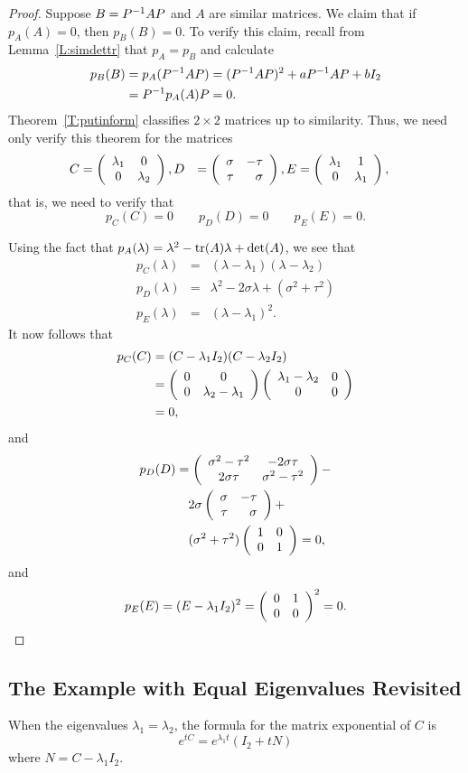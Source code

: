 \documentclass{ximera}
\begin{document}
\begin{proof}  Suppose $B=P^{-1} AP$ and $A$ are similar matrices.  We claim that
if $p_A(A)=0$, then $p_B(B)=0$.  To verify this claim, recall from
Lemma~\ref{L:simdettr} that $p_A=p_B$ and calculate
\begin{align*}
  p_B(B) &= p_A(P^{-1} AP) = (P^{-1} AP)^2 + aP^{-1} AP + bI_2 \\
  &= P^{-1} p_A(A)P= 0.
\end{align*}
Theorem~\ref{T:putinform} classifies $2\times 2$ matrices up to similarity.
Thus, we need only verify this theorem for the matrices
\begin{align*}
C &=  \left(\begin{array}{cc} \lambda_1 & 0\\ 0 &\lambda_2\end{array}\right),
D &=  \left(\begin{array}{rr} \sigma & -\tau\\ \tau &\sigma\end{array}\right),
E &=  \left(\begin{array}{cc} \lambda_1 & 1\\ 0 &\lambda_1\end{array}\right),
\end{align*}
that is, we need to verify that
\[
p_C(C) = 0 \qquad p_D(D)=0 \qquad p_E(E)=0.
\]

Using the fact that $p_A(\lambda)=\lambda^2-{\rm tr}(A)\lambda+\det(A)$, we see
that
\begin{eqnarray*}
p_C(\lambda) & = & (\lambda-\lambda_1)(\lambda-\lambda_2) \\
p_D(\lambda) & = & \lambda^2 - 2\sigma \lambda + (\sigma^2+\tau^2) \\
p_E(\lambda) & = & (\lambda-\lambda_1)^2.
\end{eqnarray*}
It now follows that
\begin{align*}
  p_C(C) &= (C-\lambda_1I_2)(C-\lambda_2I_2) 
           \\
&=\left(\begin{array}{cc} 0 & 0\\ 0 &\lambda_2-\lambda_1\end{array}\right)\left(\begin{array}{cc} \lambda_1-\lambda_2 & 0\\ 0 &0\end{array}\right) \\
&=0,
\end{align*}
and
\begin{align*}
p_D(D) &=
\left(\begin{array}{cc} \sigma^2-\tau^2 & -2\sigma\tau\\ 2\sigma\tau &\sigma^2-\tau^2\end{array}\right) -\\
       &\quad 2\sigma \left(\begin{array}{rr} \sigma & -\tau\\ \tau &\sigma\end{array}\right) + \\
  &\quad (\sigma^2+\tau^2)\left(\begin{array}{rr} 1 & 0\\ 0 &1\end{array}\right) = 0,
\end{align*}
and
\[
p_E(E) = (E-\lambda_1I_2)^2 = \left(\begin{array}{rr} 0 & 1\\ 0 &0\end{array}\right)^2 = 0.
\]
\end{proof}


\subsection*{The Example with Equal Eigenvalues Revisited}

When the eigenvalues $\lambda_1=\lambda_2$, the formula for the matrix 
exponential of $C$ is
\begin{equation}  \label{E:exeq}
e^{tC} = e^{\lambda_1 t}(I_2 + tN)
\end{equation}
where $N = C - \lambda_1I_2$.
\end{document}
